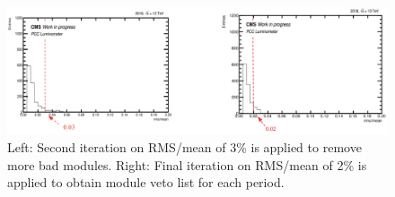 \begin{figure}[!htp]
    \centering
        \centering
        \includegraphics[width=1.0\linewidth]{ashish_thesis/3percent_cut_1.png}
    
    \caption[Second and Final Iteration For Outlier Module Removal]{%
        Left: Second iteration on RMS/mean of 3\% is applied to remove more bad modules. 
        Right: Final iteration on RMS/mean of 2\% is applied to obtain module veto list for each period.
    }
    \label{fig:sec_it_cut}
\end{figure}








